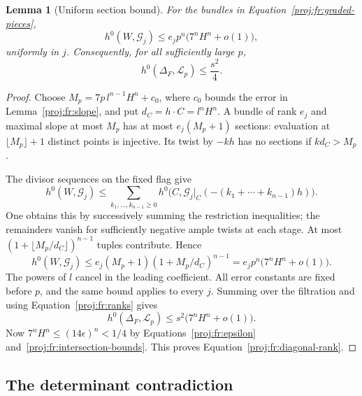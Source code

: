 \documentclass[11pt,letterpaper]{article}
\newtheorem{lemma}[theorem]{Lemma}
\theoremstyle{definition}
\theoremstyle{remark}
\begin{document}
\begin{lemma}[Uniform section bound]
\label{proj:fr:sections}
For the bundles in Equation~\eqref{proj:fr:graded-pieces},
\[
 h^0(W,\mathcal G_j)
      \leq e_jp^n\bigl(7^nH^n+o(1)\bigr),
\]
uniformly in \(j\). Consequently, for all sufficiently large \(p\),
\begin{equation}
\label{proj:fr:diagonal-rank}
 h^0(\Delta_F,\mathcal L_p)\leq\frac{s^2}{4}.
\end{equation}
\end{lemma}

\begin{proof}
Choose \(M_p=7p\,l^{n-1}H^n+c_0\), where \(c_0\) bounds the error in
Lemma~\ref{proj:fr:slope}, and put \(d_C=h\cdot C=l^nH^n\).
A bundle of rank \(e_j\) and maximal slope at most \(M_p\) has at
most \(e_j(M_p+1)\) sections: evaluation at
\(\lfloor M_p\rfloor+1\) distinct points is injective.
Its twist by \(-kh\) has no sections if \(kd_C>M_p\).

The divisor sequences on the fixed flag give
\[
 h^0(W,\mathcal G_j)
 \leq
 \sum_{k_1,\ldots,k_{n-1}\geq0}
 h^0\bigl(C,\mathcal G_j|_C
                    (-(k_1+\cdots+k_{n-1})h)\bigr).
\]
One obtains this by successively summing the restriction inequalities;
the remainders vanish for sufficiently negative ample twists at each
stage. At most
\((1+\lfloor M_p/d_C\rfloor)^{n-1}\) tuples contribute. Hence
\[
 h^0(W,\mathcal G_j)
 \leq e_j(M_p+1)(1+M_p/d_C)^{n-1}
 =e_jp^n\bigl(7^nH^n+o(1)\bigr).
\]
The powers of \(l\) cancel in the leading coefficient.
All error constants are fixed before \(p\), and the same bound applies
to every \(j\). Summing over the filtration and using
Equation~\eqref{proj:fr:ranks} gives
\[
 h^0(\Delta_F,\mathcal L_p)
 \leq s^2\bigl(7^nH^n+o(1)\bigr).
\]
Now \(7^nH^n\leq(14\epsilon)^n<1/4\) by
Equations~\eqref{proj:fr:epsilon} and~\eqref{proj:fr:intersection-bounds}.
This proves Equation~\eqref{proj:fr:diagonal-rank}.
\end{proof}

\subsection{The determinant contradiction}
\end{document}
